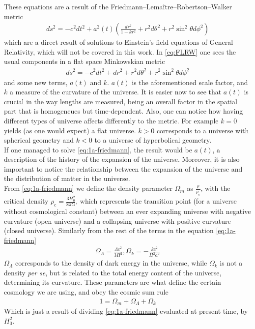 These equations are a result of the Friedmann–Lemaître–Robertson–Walker metric 
\begin{align}
	ds ^2 = -c^2 dt^2  + a^2(t) \left( \frac{dr^2}{1-kr^2} +r^2d\theta ^2 + r^2 \sin^2\theta d\phi^2\right) 
	\label{eq:FLRW}
\end{align}which are a direct result of solutions to Einstein's field equations of General Relativity, which will not be covered in this work. In \eqref{eq:FLRW} one sees the usual components in a flat space Minkowskian metric 
\begin{align}
	ds^2 = -c^2dt^2 + dr^2 + r^2d\theta^2 + r^2 \sin^2\theta d\phi^2
\end{align} and some new terms, $a(t)$ and $k$. $a(t)$ is the aforementioned scale factor, and $k$ a measure of the curvature of the universe. It is easier now to see that $a(t)$ is crucial in the way lengths are measured, being an overall factor in the spatial part that is homogeneues but time-dependent. Also, one can notice how having different types of universe affects differently to the metric. For example $k=0$ yields (as one would expect) a flat universe. $k>0$ corresponds to a universe with spherical geometry and $k<0$ to a universe of hyperbolical geometry. \\

If one managed to solve \eqref{eq:1a-friedmann}, the result would be $a(t)$, a description of the history of the expansion of the universe. Moreover, it is also important to notice the relationship between the expansion of the universe and the distribution of matter in the universe. \\

From \eqref{eq:1a-friedmann} we define the density parameter $\Omega_m$ as $\frac{\rho}{\rho_{\text{c}}}$, with the critical density $\rho_{\text{c}} = \frac{3H_0^2}{8\pi G}$, which represents the transition point (for a universe without cosmological constant) between an ever expanding universe with negative curvature (open universe) and a collapsing universe with positive curvature (closed universe). Similarly from the rest of the terms in the equation \eqref{eq:1a-friedmann}
\begin{align}
 \Omega_\Lambda = \frac{\Lambda c^2}{3H^2}, \Omega_k = -\frac{kc^2}{H^2a^2} 
 \label{eq:definitions}
\end{align}
$\Omega_\Lambda$ corresponds to the density of dark energy in the universe, while $\Omega_k$ is not a density \textit{per se}, but is related to the total energy content of the universe, determining its curvature.
These parameters are what define the certain cosmology we are using, and obey the cosmic sum rule 
\begin{align}
	1 = \Omega_m + \Omega_\Lambda + \Omega_k
\end{align}
Which is just a result of dividing \eqref{eq:1a-friedmann} evaluated at present time, by  $H_0^2$. \\

